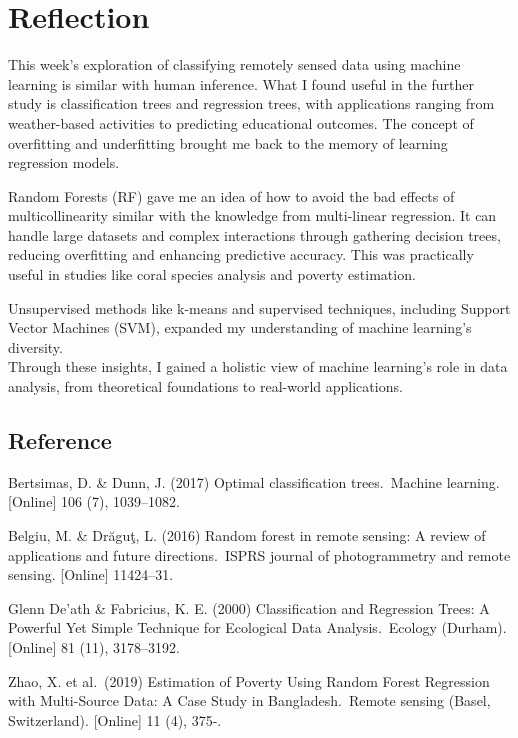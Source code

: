 \documentclass[
  letterpaper,
  DIV=11,
  numbers=noendperiod]{scrreprt}
\begin{document}

\chapter{Reflection}\label{reflection-3}

This week's exploration of classifying remotely sensed data using
machine learning is similar with human inference. What I found useful in
the further study is classification trees and regression trees, with
applications ranging from weather-based activities to predicting
educational outcomes. The concept of overfitting and underfitting
brought me back to the memory of learning regression models.

Random Forests (RF) gave me an idea of how to avoid the bad effects of
multicollinearity similar with the knowledge from multi-linear
regression. It can handle large datasets and complex interactions
through gathering decision trees, reducing overfitting and enhancing
predictive accuracy. This was practically useful in studies like coral
species analysis and poverty estimation.

Unsupervised methods like k-means and supervised techniques, including
Support Vector Machines (SVM), expanded my understanding of machine
learning's diversity.\\
Through these insights, I gained a holistic view of machine learning's
role in data analysis, from theoretical foundations to real-world
applications.

\section{\texorpdfstring{\textbf{Reference}}{Reference}}\label{reference}

Bertsimas, D. \& Dunn, J. (2017) Optimal classification trees.~Machine
learning. {[}Online{]} 106 (7), 1039--1082.

Belgiu, M. \& Drăguţ, L. (2016) Random forest in remote sensing: A
review of applications and future directions.~ISPRS journal of
photogrammetry and remote sensing. {[}Online{]} 11424--31.

Glenn De'ath \& Fabricius, K. E. (2000) Classification and Regression
Trees: A Powerful Yet Simple Technique for Ecological Data
Analysis.~Ecology (Durham). {[}Online{]} 81 (11), 3178--3192.

Zhao, X. et al.~(2019) Estimation of Poverty Using Random Forest
Regression with Multi-Source Data: A Case Study in Bangladesh.~Remote
sensing (Basel, Switzerland). {[}Online{]} 11 (4), 375-.
\end{document}
